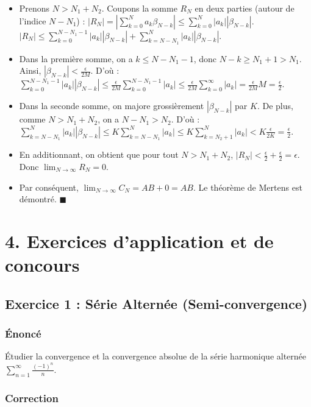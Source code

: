 \documentclass[12pt,a4paper]{report}
\begin{document}
\begin{itemize}
\item Prenons $N > N_1 + N_2$. Coupons la somme $R_N$ en deux parties (autour de l'indice $N - N_1$) :
    $|R_N| = \left| \sum_{k=0}^N a_k \beta_{N-k} \right| \le \sum_{k=0}^N |a_k| |\beta_{N-k}|$.
    $|R_N| \le \sum_{k=0}^{N-N_1-1} |a_k| |\beta_{N-k}| + \sum_{k=N-N_1}^N |a_k| |\beta_{N-k}|$.
\item Dans la première somme, on a $k \le N - N_1 - 1$, donc $N - k \ge N_1 + 1 > N_1$. Ainsi, $|\beta_{N-k}| < \frac{\epsilon}{2M}$.
    D'où : $\sum_{k=0}^{N-N_1-1} |a_k| |\beta_{N-k}| \le \frac{\epsilon}{2M} \sum_{k=0}^{N-N_1-1} |a_k| \le \frac{\epsilon}{2M} \sum_{k=0}^\infty |a_k| = \frac{\epsilon}{2M} M = \frac{\epsilon}{2}$.
\item Dans la seconde somme, on majore grossièrement $|\beta_{N-k}|$ par $K$. De plus, comme $N > N_1 + N_2$, on a $N - N_1 > N_2$.
    D'où : $\sum_{k=N-N_1}^N |a_k| |\beta_{N-k}| \le K \sum_{k=N-N_1}^N |a_k| \le K \sum_{k=N_2+1}^N |a_k| < K \frac{\epsilon}{2K} = \frac{\epsilon}{2}$.
\item En additionnant, on obtient que pour tout $N > N_1 + N_2$, $|R_N| < \frac{\epsilon}{2} + \frac{\epsilon}{2} = \epsilon$.
    Donc $\lim_{N\to\infty} R_N = 0$.
\item Par conséquent, $\lim_{N\to\infty} C_N = A B + 0 = A B$. Le théorème de Mertens est démontré. $\blacksquare$
\end{itemize}

\section{4. Exercices d'application et de concours}


\subsection{Exercice 1 : Série Alternée (Semi-convergence)}

\subsubsection{Énoncé}
Étudier la convergence et la convergence absolue de la série harmonique alternée $\sum_{n=1}^\infty \frac{(-1)^n}{n}$.

\subsubsection{Correction}
\end{document}
